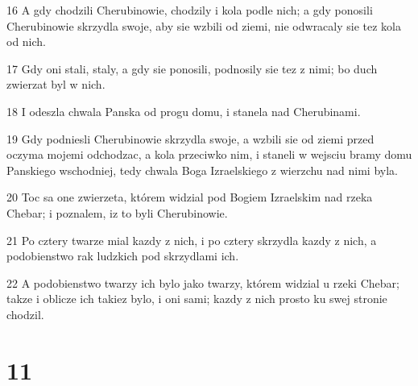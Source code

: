 \par 16 A gdy chodzili Cherubinowie, chodzily i kola podle nich; a gdy ponosili Cherubinowie skrzydla swoje, aby sie wzbili od ziemi, nie odwracaly sie tez kola od nich.
\par 17 Gdy oni stali, staly, a gdy sie ponosili, podnosily sie tez z nimi; bo duch zwierzat byl w nich.
\par 18 I odeszla chwala Panska od progu domu, i stanela nad Cherubinami.
\par 19 Gdy podniesli Cherubinowie skrzydla swoje, a wzbili sie od ziemi przed oczyma mojemi odchodzac, a kola przeciwko nim, i staneli w wejsciu bramy domu Panskiego wschodniej, tedy chwala Boga Izraelskiego z wierzchu nad nimi byla.
\par 20 Toc sa one zwierzeta, którem widzial pod Bogiem Izraelskim nad rzeka Chebar; i poznalem, iz to byli Cherubinowie.
\par 21 Po cztery twarze mial kazdy z nich, i po cztery skrzydla kazdy z nich, a podobienstwo rak ludzkich pod skrzydlami ich.
\par 22 A podobienstwo twarzy ich bylo jako twarzy, którem widzial u rzeki Chebar; takze i oblicze ich takiez bylo, i oni sami; kazdy z nich prosto ku swej stronie chodzil.

\chapter{11}

